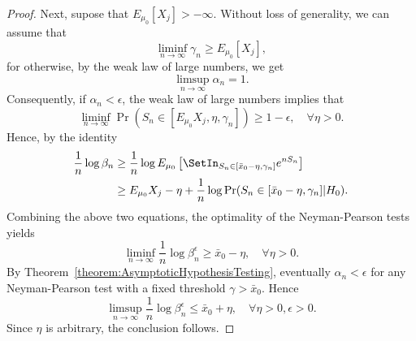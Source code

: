 \begin{proof}
Next, supose that $E_{\mu_0} [X_j] > - \infty$.
Without loss of generality, we can assume that
\begin{equation*}
\liminf_{n \rightarrow \infty} \gamma_n \geq E_{\mu_0} [X_j],
\end{equation*}
for otherwise, by the weak law of large numbers, we get
\begin{equation*}
\limsup_{n \rightarrow \infty} \alpha_n = 1 .
\end{equation*}
Consequently, if $\alpha_n < \epsilon$, the weak law of large numbers implies that
\begin{equation*}
\liminf_{n \rightarrow \infty} \Pr (S_n \in [ E_{\mu_0} X_j, \eta, \gamma_n]) \geq 1 - \epsilon, \quad \forall \eta > 0 .
\end{equation*}
Hence, by the identity
\begin{equation*}
\begin{split}
\frac{1}{n} \log \beta_n
&\geq \frac{1}{n} \log E_{\mu_0} \left[ \SetIn_{ S_n \in [\bar{x}_0 - \eta, \gamma_n] }
e^{n S_n} \right] \\
&\geq E_{\mu_0} X_j - \eta + \frac{1}{n} \log \Pr (S_n \in [\bar{x}_0 - \eta, \gamma_n] | H_0) .
\end{split}
\end{equation*}
Combining the above two equations, the optimality of the Neyman-Pearson tests yields
\begin{equation*}
\liminf_{n \rightarrow \infty} \frac{1}{n} \log \beta_n^{\epsilon}
\geq \bar{x}_0 - \eta, \quad \forall \eta > 0 .
\end{equation*}
By Theorem~\ref{theorem:AsymptoticHypothesisTesting}, eventually $\alpha_n < \epsilon$ for any Neyman-Pearson test with a fixed threshold $\gamma > \bar{x}_0$.
Hence
\begin{equation*}
\limsup_{n \rightarrow \infty} \frac{1}{n} \log \beta_n^{\epsilon}
\leq \bar{x}_0 + \eta, \quad \forall \eta > 0, \epsilon > 0 .
\end{equation*}
Since $\eta$ is arbitrary, the conclusion follows.
\end{proof}


